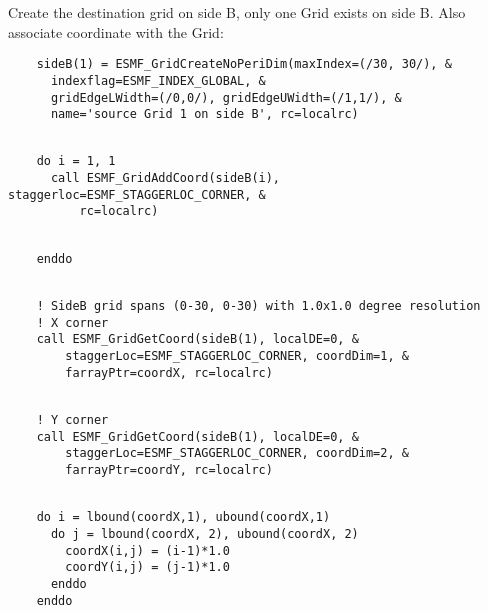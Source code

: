 
   Create the destination grid on side B, only one Grid exists on side B. Also associate
   coordinate with the Grid: 

 \begin{verbatim}
    sideB(1) = ESMF_GridCreateNoPeriDim(maxIndex=(/30, 30/), &
      indexflag=ESMF_INDEX_GLOBAL, &
      gridEdgeLWidth=(/0,0/), gridEdgeUWidth=(/1,1/), &
      name='source Grid 1 on side B', rc=localrc)
 
\end{verbatim}
 

 \begin{verbatim}
    do i = 1, 1
      call ESMF_GridAddCoord(sideB(i), staggerloc=ESMF_STAGGERLOC_CORNER, &
          rc=localrc)
 
\end{verbatim}
 

 \begin{verbatim}
    enddo
 
\end{verbatim}
 

 \begin{verbatim}
    ! SideB grid spans (0-30, 0-30) with 1.0x1.0 degree resolution
    ! X corner
    call ESMF_GridGetCoord(sideB(1), localDE=0, &
        staggerLoc=ESMF_STAGGERLOC_CORNER, coordDim=1, &
        farrayPtr=coordX, rc=localrc)
 
\end{verbatim}
 

 \begin{verbatim}
    ! Y corner
    call ESMF_GridGetCoord(sideB(1), localDE=0, &
        staggerLoc=ESMF_STAGGERLOC_CORNER, coordDim=2, &
        farrayPtr=coordY, rc=localrc)
 
\end{verbatim}
 

 \begin{verbatim}
    do i = lbound(coordX,1), ubound(coordX,1)
      do j = lbound(coordX, 2), ubound(coordX, 2)
        coordX(i,j) = (i-1)*1.0
        coordY(i,j) = (j-1)*1.0
      enddo
    enddo
 
\end{verbatim}
 
